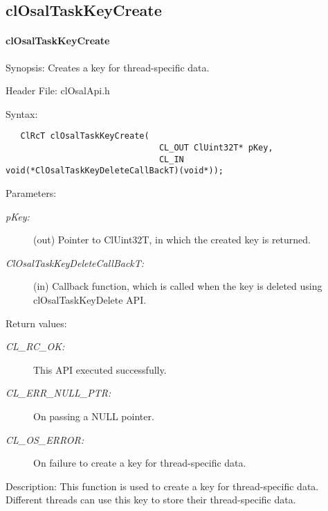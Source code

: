 \newpage
\subsection{clOsalTaskKeyCreate}
\hypertarget{pageosal123}{}\paragraph{cl\-Osal\-Task\-Key\-Create}\label{pageosal123}
\begin{Desc}
\item[Synopsis:]Creates a key for thread-specific data.\end{Desc}
\begin{Desc}
\item[Header File:]clOsalApi.h\end{Desc}
\begin{Desc}
\item[Syntax:]

\footnotesize\begin{verbatim}   ClRcT clOsalTaskKeyCreate(
                               CL_OUT ClUint32T* pKey,
                               CL_IN void(*ClOsalTaskKeyDeleteCallBackT)(void*));
\end{verbatim}
\normalsize
\end{Desc}
\begin{Desc}
\item[Parameters:]
\begin{description}
\item[{\em p\-Key:}](out) Pointer to Cl\-Uint32T, in which the created key is returned.\item[{\em Cl\-Osal\-Task\-Key\-Delete\-Call\-Back\-T:}](in) Callback 
function, which is called when the key is deleted using cl\-Osal\-Task\-Key\-Delete API.\end{description}
\end{Desc}
\begin{Desc}
\item[Return values:]
\begin{description}
\item[{\em CL\_\-RC\_\-OK:}]This API executed successfully. \item[{\em CL\_\-ERR\_\-NULL\_\-PTR:}]On passing a NULL pointer. \item[{\em CL\_\-OS\_\-ERROR:}]On failure to create a key for thread-specific data.\end{description}
\end{Desc}
\begin{Desc}
\item[Description:]This function is used to create a key for thread-specific data. Different threads can use this key to store their thread-specific data.\end{Desc}
